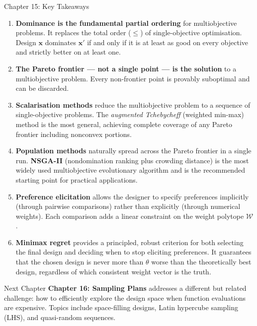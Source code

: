 \documentclass[aspectratio=169,10pt]{beamer}
\newcommand{\bx}{\mathbf{x}}
\begin{document}
\begin{frame}[allowframebreaks]{Chapter 15: Key Takeaways}

\begin{enumerate}
  \item \textbf{Dominance is the fundamental partial ordering} for
    multiobjective problems.  It replaces the total order ($\le$) of
    single-objective optimisation.  Design $\bx$ dominates $\bx'$ if and
    only if it is at least as good on every objective and strictly better
    on at least one.

  \item \textbf{The Pareto frontier --- not a single point --- is the
    solution} to a multiobjective problem.  Every non-frontier point is
    provably suboptimal and can be discarded.

  \item \textbf{Scalarisation methods} reduce the multiobjective problem to
    a sequence of single-objective problems.  The \emph{augmented Tchebycheff}
    (weighted min-max) method is the most general, achieving complete coverage
    of any Pareto frontier including nonconvex portions.

  \item \textbf{Population methods} naturally spread across the Pareto
    frontier in a single run.  \textbf{NSGA-II} (nondomination ranking plus
    crowding distance) is the most widely used multiobjective evolutionary
    algorithm and is the recommended starting point for practical applications.

  \item \textbf{Preference elicitation} allows the designer to specify
    preferences implicitly (through pairwise comparisons) rather than
    explicitly (through numerical weights).  Each comparison adds a linear
    constraint on the weight polytope $\mathcal{W}$.

  \item \textbf{Minimax regret} provides a principled, robust criterion for
    both selecting the final design and deciding when to stop eliciting
    preferences.  It guarantees that the chosen design is never more than
    $\theta$ worse than the theoretically best design, regardless of which
    consistent weight vector is the truth.
\end{enumerate}

\begin{block}{Next Chapter}
  \textbf{Chapter 16: Sampling Plans} addresses a different but related
  challenge: how to efficiently explore the design space when function
  evaluations are expensive.  Topics include space-filling designs,
  Latin hypercube sampling (LHS), and quasi-random sequences.
\end{block}

\end{frame}
\end{document}
